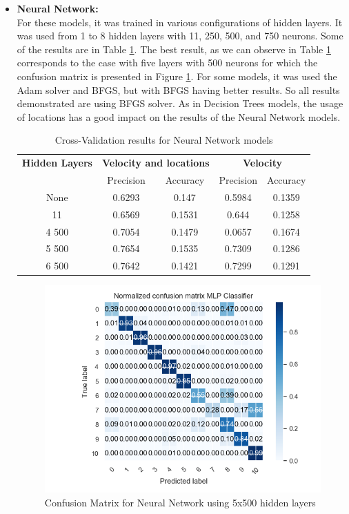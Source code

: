 \begin{itemize}
\newpage
\item \textbf{Neural Network: }\\
For these models, it was trained in various configurations of hidden layers. It was used from 1 to 8 hidden layers with 11, 250, 500, and 750 neurons. Some of the results are in Table \ref{table:cross_val_nn}. The best result, as we can observe in Table \ref{table:cross_val_nn} corresponds to the case with five layers with 500 neurons for which the confusion matrix is presented in Figure \ref{fig:cm_nn}.
For some models, it was used the Adam solver and BFGS, but with BFGS having better results. So all results demonstrated are using BFGS solver.
As in Decision Trees models, the usage of locations has a good impact on the results of the Neural Network models.


\begin {table}[H]
\begin{center}
\begin{tabular}{c|c|c|c|c}
\multicolumn{1}{c|}{\textbf{Hidden Layers } } &\multicolumn{2}{c|}{\textbf{ Velocity and locations}}& \multicolumn{2}{c}{\textbf{ Velocity}}\\
&Precision & Accuracy & Precision & Accuracy \\
\hline
None &0.6293&0.147 &0.5984 &0.1359\\
11 & 0.6569&0.1531 &0.644 &0.1258\\
4 500 &0.7054&0.1479 & 0.0657 & 0.1674\\
5 500 & 0.7654&0.1535 &0.7309 & 0.1286\\
6 500 &0.7642 &0.1421 &0.7299 &0.1291 
\label{table:cross_val_nn}
\end{tabular}
\caption {Cross-Validation results for Neural Network models}
\end{center}
\end {table}


\begin{figure}[h]
\centering
\includegraphics[width=0.8\linewidth]{Chapters/img/CM_NN.png}
\caption{Confusion Matrix for Neural Network using 5x500 hidden layers}
\label{fig:cm_nn}
\end{figure}



\end{itemize}
